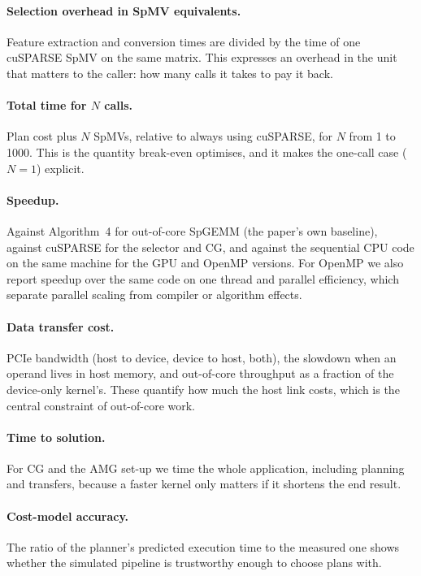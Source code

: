 \paragraph{Selection overhead in SpMV equivalents.} Feature extraction and conversion times are divided by the time of
one cuSPARSE SpMV on the same matrix. This expresses an overhead in the unit that matters to the caller: how many calls
it takes to pay it back.

\paragraph{Total time for $N$ calls.} Plan cost plus $N$ SpMVs, relative to always using cuSPARSE, for $N$ from 1 to
1000. This is the quantity break-even optimises, and it makes the one-call case ($N=1$) explicit.

\paragraph{Speedup.} Against Algorithm~4 for out-of-core SpGEMM (the paper's own baseline), against cuSPARSE for the
selector and CG, and against the sequential CPU code on the same machine for the GPU and OpenMP versions. For
OpenMP we also report speedup over the same code on one thread and parallel efficiency, which separate parallel
scaling from compiler or algorithm effects.

\paragraph{Data transfer cost.} PCIe bandwidth (host to device, device to host, both), the slowdown when an operand
lives in host memory, and out-of-core throughput as a fraction of the device-only kernel's. These quantify how much the
host link costs, which is the central constraint of out-of-core work.

\paragraph{Time to solution.} For CG and the AMG set-up we time the whole application, including planning and
transfers, because a faster kernel only matters if it shortens the end result.

\paragraph{Cost-model accuracy.} The ratio of the planner's predicted execution time to the measured one shows whether
the simulated pipeline is trustworthy enough to choose plans with.
